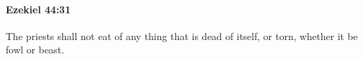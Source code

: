 
		\paragraph{Ezekiel 44:31} %
			\label{EZEKIEL-44-31}

			The priests shall not eat of any thing that is dead of itself, or torn, whether it be fowl or beast.


